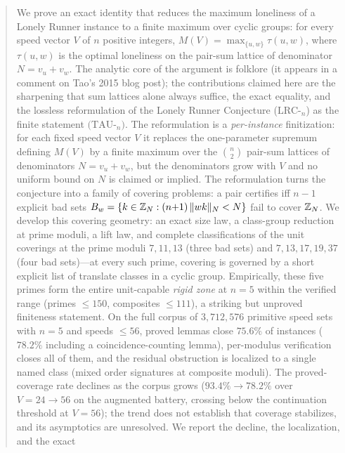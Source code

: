 
\begin{abstract}
\noindent
We prove an exact identity that reduces the maximum loneliness of a Lonely
Runner instance to a finite maximum over cyclic groups: for every speed
vector $V$ of $n$ positive integers,
$M(V)=\max_{\{u,w\}}\tau(u,w)$, where $\tau(u,w)$ is the optimal loneliness
on the pair-sum lattice of denominator $N=v_u+v_w$. The analytic core of the
argument is folklore (it appears in a comment on Tao's 2015 blog post); the
contributions claimed here are the sharpening that sum lattices alone always
suffice, the exact equality, and the lossless reformulation of the Lonely
Runner Conjecture ($\mathrm{LRC}$-$_n$) as the finite statement
$(\mathrm{TAU}$-$_n)$. The reformulation is a \emph{per-instance}
finitization: for each fixed speed vector $V$ it replaces the
one-parameter supremum defining $M(V)$ by a finite maximum over the
$\binom{n}{2}$ pair-sum lattices of denominators $N=v_u+v_w$, but the
denominators grow with $V$ and no uniform bound on $N$ is claimed or
implied. The reformulation turns the conjecture into a family
of covering problems: a pair certifies iff $n-1$ explicit bad sets
$B_w=\{k\in\Z_N : (n{+}1)\,\wn{wk}<N\}$ fail to cover $\Z_N$. We develop
this covering geometry: an exact size law, a class-group reduction at prime
moduli, a lift law, and complete classifications of the unit coverings at
the prime moduli $7,11,13$ (three bad sets) and $7,13,17,19,37$ (four bad
sets)---at every such prime, covering is governed by a short explicit list
of translate classes in a cyclic group. Empirically, these five primes form
the entire unit-capable \emph{rigid zone} at $n=5$ within the verified range
(primes $\le 150$, composites $\le 111$), a striking but unproved finiteness
statement. On the full corpus of $3{,}712{,}576$ primitive speed sets with
$n=5$ and speeds $\le 56$, proved lemmas close $75.6\%$ of instances
($78.2\%$ including a coincidence-counting lemma), per-modulus verification
closes all of them, and the residual obstruction is localized to a single
named class (mixed order signatures at composite moduli). The proved-coverage
rate declines as the corpus grows ($93.4\%\to78.2\%$ over $V=24\to56$ on the
augmented battery, crossing below the continuation threshold at $V=56$);
the trend does not establish that coverage stabilizes, and its asymptotics
are unresolved. We report the decline, the localization, and the exact

\end{abstract}
